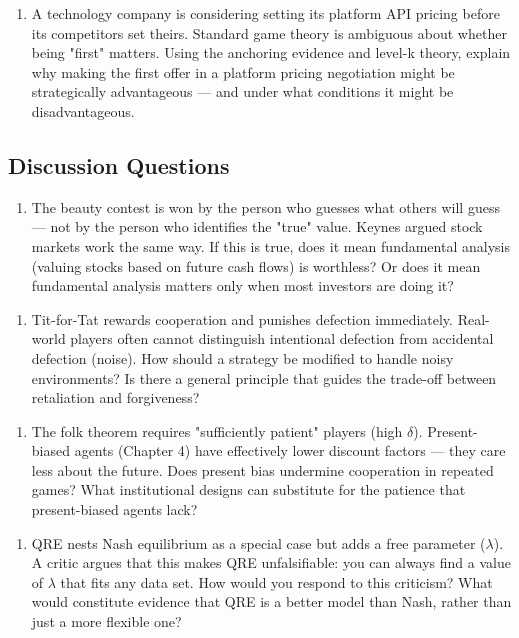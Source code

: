 \documentclass[12pt, letterpaper]{article}
\begin{document}
\begin{enumerate}
\item A technology company is considering setting its platform API pricing before its competitors set theirs. Standard game theory is ambiguous about whether being "first" matters. Using the anchoring evidence and level-k theory, explain why making the first offer in a platform pricing negotiation might be strategically advantageous --- and under what conditions it might be disadvantageous.
\end{enumerate}


\subsection{Discussion Questions}


\begin{enumerate}
\item The beauty contest is won by the person who guesses what others will guess --- not by the person who identifies the "true" value. Keynes argued stock markets work the same way. If this is true, does it mean fundamental analysis (valuing stocks based on future cash flows) is worthless? Or does it mean fundamental analysis matters only when most investors are doing it?
\end{enumerate}

\begin{enumerate}
\item Tit-for-Tat rewards cooperation and punishes defection immediately. Real-world players often cannot distinguish intentional defection from accidental defection (noise). How should a strategy be modified to handle noisy environments? Is there a general principle that guides the trade-off between retaliation and forgiveness?
\end{enumerate}

\begin{enumerate}
\item The folk theorem requires "sufficiently patient" players (high $\delta$). Present-biased agents (Chapter 4) have effectively lower discount factors --- they care less about the future. Does present bias undermine cooperation in repeated games? What institutional designs can substitute for the patience that present-biased agents lack?
\end{enumerate}

\begin{enumerate}
\item QRE nests Nash equilibrium as a special case but adds a free parameter ($\lambda$). A critic argues that this makes QRE unfalsifiable: you can always find a value of $\lambda$ that fits any data set. How would you respond to this criticism? What would constitute evidence that QRE is a better model than Nash, rather than just a more flexible one?
\end{enumerate}
\end{document}
